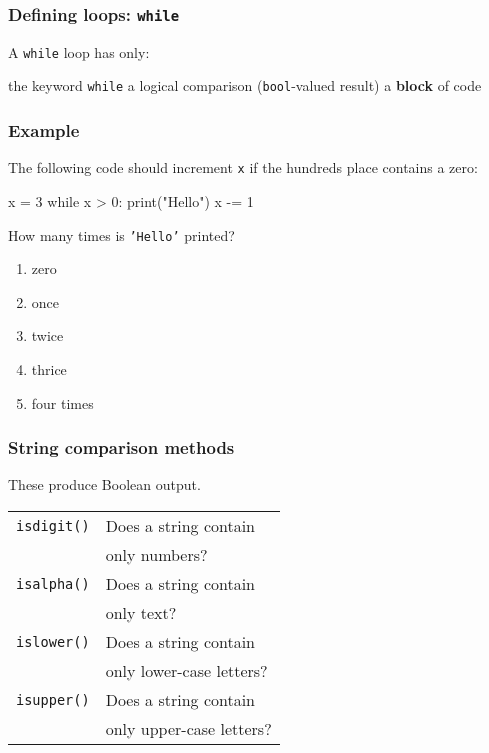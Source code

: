 \documentclass[11pt]{beamer}
\begin{document}
\begin{frame}[fragile]
  \frametitle{Defining loops:  \texttt{while}}
  \Enlarge

  \begin{itemize}
  \myitem  A \texttt{while} loop has only:
    \begin{itemize}
    \mysubitem  the keyword \texttt{while}
    \mysubitem  a logical comparison (\texttt{bool}-valued result)
    \mysubitem  a \textbf{block} of code
    \end{itemize}
  \end{itemize}
\end{frame}

\begin{frame}[fragile]
  \frametitle{Example}
  \Enlarge

  The following code should increment \texttt{x} if the hundreds place contains a zero:
  \begin{semiverbatim}
x = 3
while x > 0:
    print("Hello")
    x -= 1
  \end{semiverbatim}
  How many times is \texttt{'Hello'} printed?
  \begin{enumerate}[label=\Alph*]
  \item  zero
  \item  once
  \item  twice
  \item  thrice
  \item  four times
  \end{enumerate}
\end{frame}

\begin{frame}[fragile]
  \frametitle{String comparison methods}
  \Enlarge

  \begin{itemize}
  \myitem  These produce Boolean output.
    \begin{tabular}{ll}
    \texttt{isdigit()} & Does a string contain \\
    & only numbers? \\
    \texttt{isalpha()} & Does a string contain \\
    & only text? \\
    \texttt{islower()} & Does a string contain \\
    & only lower-case letters? \\
    \texttt{isupper()} & Does a string contain \\
    & only upper-case letters?
    \end{tabular}
  \end{itemize}
\end{frame}
\end{document}

